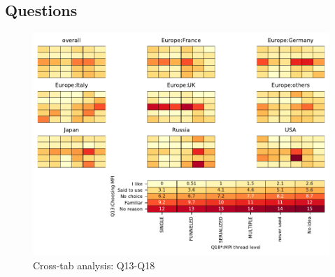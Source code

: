 
\subsection{Questions}


\begin{figure}
\begin{center}
\includegraphics[width=12cm]{../pdfs/Q13-Q18.pdf}
\caption{Cross-tab analysis: Q13-Q18}
\label{fig:Q13-Q18}
\end{center}
\end{figure}
